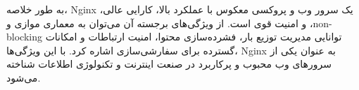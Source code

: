\documentclass[a4paper,10pt]{article}
\begin{document}
    \vspace{15pt}

    \begin{conclusion}

        به طور خلاصه، Nginx یک سرور وب و پروکسی معکوس با عملکرد بالا، کارایی عالی، و امنیت قوی است. از ویژگی‌های برجسته آن می‌توان به معماری موازی و ،non-blocking توانایی مدیریت توزیع بار، فشرده‌سازی محتوا، امنیت ارتباطات و امکانات گسترده برای سفارشی‌سازی اشاره کرد. با این ویژگی‌ها، Nginx به عنوان یکی از سرورهای وب محبوب و پرکاربرد در صنعت اینترنت و تکنولوژی اطلاعات شناخته می‌شود.

    \end{conclusion}
    
\end{document}
